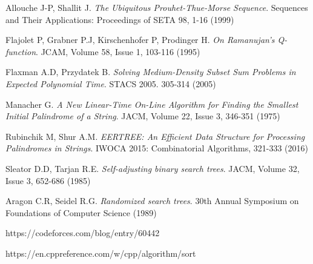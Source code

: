 \begin{thebibliography}{99}
 Allouche J-P, Shallit J. \textit{The Ubiquitous Prouhet-Thue-Morse Sequence}. Sequences and Their Applications: Proceedings of SETA 98, 1-16 (1999)

 Flajolet P, Grabner P.J, Kirschenhofer P, Prodinger H. \textit{On Ramanujan's Q-function}. JCAM, Volume 58, Issue 1, 103-116 (1995)

\newpage

 Flaxman A.D, Przydatek B. \textit{Solving Medium-Density Subset Sum Problems
in Expected Polynomial Time}. STACS 2005. 305-314 (2005)

 Manacher G. \textit{A New Linear-Time On-Line Algorithm for Finding the Smallest Initial Palindrome of a String}. JACM, Volume 22, Issue 3, 346-351 (1975)

 Rubinchik M, Shur A.M. \textit{EERTREE: An Efficient Data Structure for Processing Palindromes in Strings}. IWOCA 2015: Combinatorial Algorithms, 321-333 (2016)

 Sleator D.D, Tarjan R.E. \textit{Self-adjusting binary search trees}. JACM, Volume 32, Issue 3, 652-686 (1985)

 Aragon C.R, Seidel R.G. \textit{Randomized search trees}. 30th Annual Symposium on Foundations of Computer Science (1989)

 https://codeforces.com/blog/entry/60442

 https://en.cppreference.com/w/cpp/algorithm/sort

\end{thebibliography}

